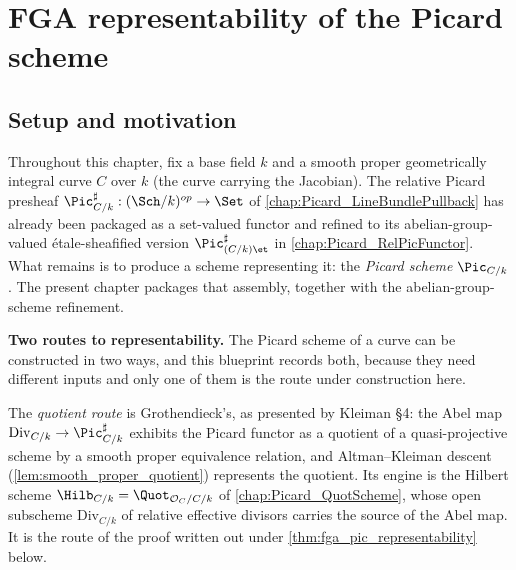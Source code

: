 \chapter{FGA representability of the Picard scheme}
\label{chap:Picard_FGAPicRepresentability}

\section{Setup and motivation}
\label{sec:fga_pic_setup}

Throughout this chapter, fix a base field \(k\) and a smooth proper geometrically
integral curve \(C\) over \(k\) (the curve carrying the Jacobian). The relative
Picard presheaf \(\Pic^\sharp_{C/k} : (\Sch/k)^{op} \to \Set\) of
\cref{chap:Picard_LineBundlePullback} has already been packaged as a
set-valued functor and refined to its abelian-group-valued
\'etale-sheafified version \(\Pic^\sharp_{(C/k)\et}\) in
\cref{chap:Picard_RelPicFunctor}. What remains is to produce a scheme
representing it: the \emph{Picard scheme} \(\Pic_{C/k}\). The present chapter
packages that assembly, together with the abelian-group-scheme refinement.

\medskip

\textbf{Two routes to representability.} The Picard scheme of a curve can be
constructed in two ways, and this blueprint records both, because they need
different inputs and only one of them is the route under construction here.

The \emph{quotient route} is Grothendieck's, as presented by Kleiman \S 4: the
Abel map \(\mathrm{Div}_{C/k} \to \Pic^\sharp_{C/k}\) exhibits the Picard functor
as a quotient of a quasi-projective scheme by a smooth proper equivalence
relation, and Altman--Kleiman descent
(\cref{lem:smooth_proper_quotient}) represents the quotient. Its engine is the
Hilbert scheme \(\Hilb_{C/k} = \Quot_{\mathcal{O}_C/C/k}\) of
\cref{chap:Picard_QuotScheme}, whose open subscheme \(\mathrm{Div}_{C/k}\) of
relative effective divisors carries the source of the Abel map. It is the route of
the proof written out under \cref{thm:fga_pic_representability} below.

